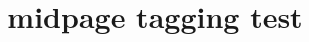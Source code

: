 \documentclass{article}
\title{midpage tagging test}
\begin{document}
\kant[1-2]
\clearpage
\begin{midpage}
\kant[3-4]
\end{midpage}
\clearpage
\kant[5-6]
\end{document}
